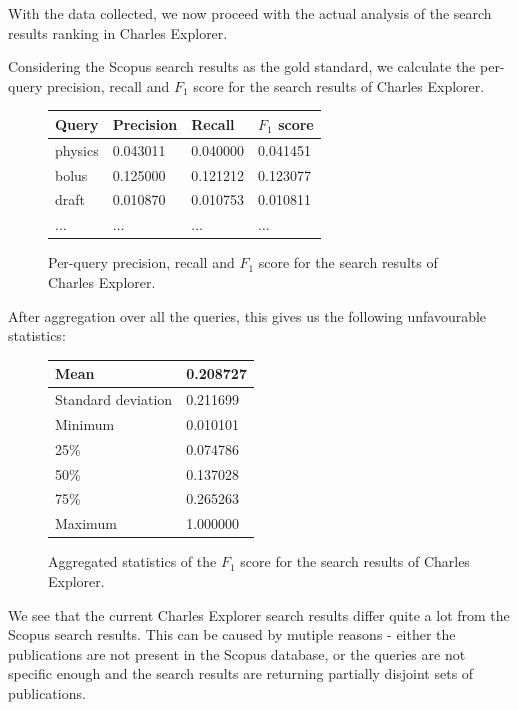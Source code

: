 With the data collected, we now proceed with the actual analysis of the search results ranking in Charles Explorer.

Considering the Scopus search results as the gold standard, we calculate the per-query precision, recall and $F_1$ score for the search results of Charles Explorer.

\begin{figure}[!ht]
    \captionsetup{width=.9\linewidth}
    \centering
    \begin{tabular}{|l|l|l|l|}
    \hline
        \textbf{Query} & \textbf{Precision} & \textbf{Recall} & \textbf{$F_1$ score} \\ \hline
        physics & 0.043011 & 0.040000 & 0.041451 \\ \hline
        bolus & 0.125000 & 0.121212 & 0.123077 \\ \hline
        draft & 0.010870 & 0.010753 & 0.010811 \\ \hline
        $\hdots$ & $\hdots$ & $\hdots$ & $\hdots$ \\ \hline
    \end{tabular}
    \caption{Per-query precision, recall and $F_1$ score for the search results of Charles Explorer.}
\end{figure}

After aggregation over all the queries, this gives us the following unfavourable statistics:

\begin{figure}[!ht]
    \captionsetup{width=.9\linewidth}
    \centering
    \begin{tabular}{|l|l|}
    \hline
        Mean & 0.208727 \\ \hline
        Standard deviation & 0.211699 \\ \hline
        Minimum & 0.010101 \\ \hline
        25\% & 0.074786 \\ \hline
        50\% & 0.137028 \\ \hline
        75\% & 0.265263 \\ \hline
        Maximum & 1.000000 \\ \hline
    \end{tabular}
    \caption{Aggregated statistics of the $F_1$ score for the search results of Charles Explorer.}
\end{figure}

We see that the current Charles Explorer search results differ quite a lot from the Scopus search results. 
This can be caused by mutiple reasons - either the publications are not present in the Scopus database, or the queries are not specific enough and the search results are returning partially disjoint sets of publications.

